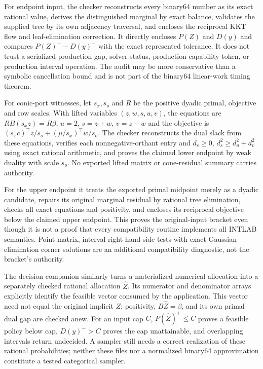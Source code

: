 For endpoint input, the checker reconstructs every binary64 number as its
exact rational value, derives the distinguished marginal by exact balance,
validates the supplied tree by its own adjacency traversal, and encloses the
reciprocal KKT flow and leaf-elimination correction. It directly encloses
$P(Z)$ and $D(y)$ and compares $P(Z)^+-D(y)^-$ with the exact represented
tolerance. It does not trust a serialized production gap, solver status,
production capability token, or production interval operation. The audit may
be more conservative than a symbolic cancellation bound and is not part of
the binary64 linear-work timing theorem.

For conic-port witnesses, let $s_x,s_o$ and $R$ be the positive dyadic primal,
objective and row scales. With lifted variables $(z,w,s,u,v)$, the equations
are $RB(s_x z)=R\beta$, $u=2$, $s=z+w$, $v=z-w$ and the objective is
$(s_xc)^\top z/s_o+(\mu/s_x)^\top w/s_o$. The checker reconstructs the dual
slack from these equations, verifies each nonnegative-orthant entry and
$d_s\ge0$, $d_s^2\ge d_u^2+d_v^2$ using exact rational arithmetic, and proves
the claimed lower endpoint by weak duality with scale $s_o$. No exported
lifted matrix or cone-residual summary carries authority.

For the upper endpoint it treats the exported primal midpoint merely as a
dyadic candidate, repairs its original marginal residual by rational tree
elimination, checks all exact equations and positivity, and encloses its
reciprocal objective below the claimed upper endpoint. This proves the
original-input bracket even though it is not a proof that every compatibility
routine implements all INTLAB semantics. Point-matrix, interval-right-hand-side
tests with exact Gaussian-elimination corner solutions are an additional
compatibility diagnostic, not the bracket's authority.

The decision companion similarly turns a materialized numerical allocation
into a separately checked rational allocation $\widehat Z$. Its numerator and
denominator arrays explicitly identify the feasible vector consumed by the
application. This vector need not equal the original implicit $Z$; positivity,
$B\widehat Z=\beta$, and its own primal--dual gap are checked anew. For an
input cap $C$, $P(\widehat Z)^+\le C$ proves a feasible policy below cap,
$D(y)^->C$ proves the cap unattainable, and overlapping intervals return
undecided. A sampler still needs a correct realization of these rational
probabilities; neither these files nor a normalized binary64 approximation
constitute a tested categorical sampler.

